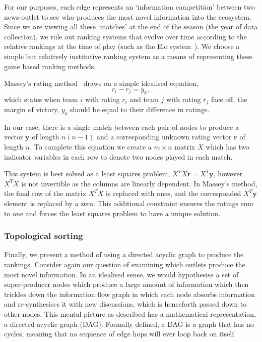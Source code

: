 For our purposes, each edge represents an `information competition' between two news-outlet to see who produces the most novel information into the ecosystem. Since we are viewing all these `matches' at the end of the season (the year of data collection), we rule out ranking systems that evolve over time according to the relative rankings at the time of play (such as the Elo system~\cite{elo_rating_1978}). We choose a simple but relatively institutive ranking system as a means of representing these game based ranking methods.


Massey's rating method~\cite{massey_statistical_1997,langville_whos_2012} draws on a simple idealised equation,
\begin{equation}
r_i- r_j=y_k,
\end{equation}
which states when team $i$ with rating $r_i$ and team $j$ with rating $r_j$ face off, the margin of victory, $y_k$ should be equal to their difference in ratings.

In our case, there is a single match between each pair of nodes to produce a vector $\mathbf{y}$ of length  $n(n-1)$ and a corresponding unknown rating vector $\mathbf{r}$ of length $n$. To complete this equation we create a $m\times n$ matrix $X$ which has two indicator variables in each row to denote two nodes played in each match.

This system is best solved as a least squares problem, $X^TX\mathbf{r}=X^T\mathbf{y}$, however $X^TX$ is not invertible as the columns are linearly dependent. In Massey's method, the final row of the matrix $X^TX$ is replaced with ones, and the corresponded $X^T\mathbf{y}$ element is replaced by a zero. This additional constraint ensures the ratings sum to one and forces the least squares problem to have a unique solution.

\subsubsection{Topological sorting}

Finally, we present a method of using a directed acyclic graph to produce the rankings. Consider again our question of examining which outlets produce the most novel information. In an idealised sense, we would hypothesise a set of super-producer nodes which produce a large amount of information which then trickles down the information flow graph in which each node absorbs information and re-synthesises it with new discussions, which is henceforth passed down to other nodes. This mental picture as described has a mathematical representation, a directed acyclic graph (DAG). Formally defined, a DAG is a graph that has no cycles, meaning that no sequence of edge hops will ever loop back on itself.

